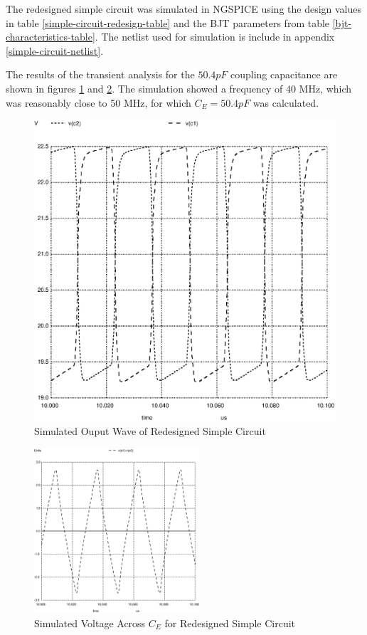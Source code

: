 \documentclass[titlepage, letterpaper, 10.5pt]{article}
\begin{document}
The redesigned simple circuit was simulated in NGSPICE using the design values in table
\ref{simple-circuit-redesign-table} and the BJT parameters from table
\ref{bjt-characteristics-table}. The netlist used for simulation is include in appendix
\ref{simple-circuit-netlist}.

The results of the transient analysis for the
$50.4pF$ coupling capacitance are shown in figures \ref{simple-circuit-output-50pF}
and \ref{simple-circuit-vcap-50pF}. The simulation showed a frequency of 40 MHz,
which was reasonably close to 50 MHz, for which $C_{E}=50.4pF$ was calculated.

\begin{figure}[ht]
	\centering
	\includegraphics[width=.55\textwidth]{ngspice/simple-circuit-output-50pF}
	\caption{Simulated Ouput Wave of Redesigned Simple Circuit}
	\label{simple-circuit-output-50pF}
\end{figure}

\begin{figure}[ht]
	\centering
	\includegraphics[width=0.55\textwidth]{ngspice/simple-circuit-vcap-50pF}
	\caption{Simulated Voltage Across $C_{E}$ for Redesigned Simple Circuit}
	\label{simple-circuit-vcap-50pF}
\end{figure}
\end{document}
